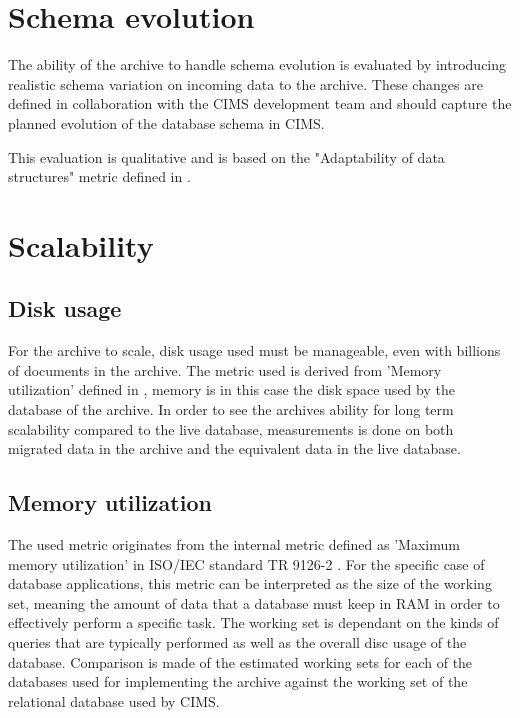 \section{Schema evolution}
The ability of the archive to handle schema evolution is evaluated by introducing realistic schema variation on incoming data to the archive. These changes are defined in collaboration with the CIMS development team and should capture the planned evolution of the database schema in CIMS.

This evaluation is qualitative and is based on the "Adaptability of data structures" metric defined in \cite{isoInternalMetric}.   

\section{Scalability}

\subsection{Disk usage}
For the archive to scale, disk usage used must be manageable, even with billions of documents in the archive. The metric used is derived from 'Memory utilization' defined in \cite{isoInternalMetric}, memory is in this case the disk space used by the database of the archive. In order to see the archives ability for long term scalability compared to the live database, measurements is done on both migrated data in the archive and the equivalent data in the live database.              

\subsection{Memory utilization}
The used metric originates from the internal metric defined as 'Maximum memory utilization' in ISO/IEC standard TR 9126-2 \cite{isoExternalMetric}. For the specific case of database applications, this metric can be interpreted as the size of the working set, meaning the amount of data that a database must keep in RAM in order to effectively perform a specific task. The working set is dependant on the kinds of queries that are typically performed as well as the overall disc usage of the database. Comparison is made of the estimated working sets for each of the databases used for implementing the archive against the working set of the relational database used by CIMS.

